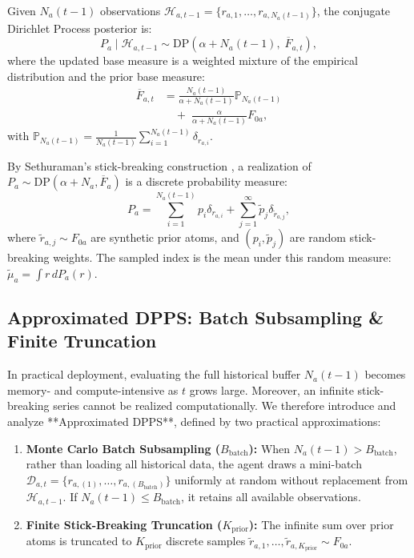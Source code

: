 \documentclass[twoside]{article}
\begin{document}
Given $N_a(t-1)$ observations $\mathcal{H}_{a, t-1} = \{r_{a, 1}, \dots, r_{a, N_a(t-1)}\}$, the conjugate Dirichlet Process posterior is:
\begin{equation}
P_a \mid \mathcal{H}_{a, t-1} \sim \text{DP}\left(\alpha + N_a(t-1), \; \overline{F}_{a, t}\right),
\end{equation}
where the updated base measure is a weighted mixture of the empirical distribution and the prior base measure:
\begin{equation}
\begin{aligned}
\overline{F}_{a, t} &= \frac{N_a(t-1)}{\alpha + N_a(t-1)} \mathbb{P}_{N_a(t-1)} \\
&\quad + \; \frac{\alpha}{\alpha + N_a(t-1)} F_{0a},
\end{aligned}
\end{equation}
with $\mathbb{P}_{N_a(t-1)} = \frac{1}{N_a(t-1)} \sum_{i=1}^{N_a(t-1)} \delta_{r_{a, i}}$.

By Sethuraman's stick-breaking construction \citep{sethuraman1994constructive}, a realization of $P_a \sim \text{DP}(\alpha + N_a, \overline{F}_a)$ is a discrete probability measure:
\begin{equation}
P_a = \sum_{i=1}^{N_a(t-1)} p_i \delta_{r_{a, i}} + \sum_{j=1}^\infty \tilde{p}_j \delta_{\tilde{r}_{a, j}},
\end{equation}
where $\tilde{r}_{a, j} \sim F_{0a}$ are synthetic prior atoms, and $(p_i, \tilde{p}_j)$ are random stick-breaking weights. The sampled index is the mean under this random measure: $\tilde{\mu}_a = \int r \, dP_a(r)$.

\subsection{Approximated DPPS: Batch Subsampling \& Finite Truncation}

In practical deployment, evaluating the full historical buffer $N_a(t-1)$ becomes memory- and compute-intensive as $t$ grows large. Moreover, an infinite stick-breaking series cannot be realized computationally. We therefore introduce and analyze **Approximated DPPS**, defined by two practical approximations:

\begin{enumerate}
    \item \textbf{Monte Carlo Batch Subsampling ($B_{\text{batch}}$):} When $N_a(t-1) > B_{\text{batch}}$, rather than loading all historical data, the agent draws a mini-batch $\mathcal{D}_{a, t} = \{r_{a, (1)}, \dots, r_{a, (B_{\text{batch}})}\}$ uniformly at random without replacement from $\mathcal{H}_{a, t-1}$. If $N_a(t-1) \le B_{\text{batch}}$, it retains all available observations.
    \item \textbf{Finite Stick-Breaking Truncation ($K_{\text{prior}}$):} The infinite sum over prior atoms is truncated to $K_{\text{prior}}$ discrete samples $\tilde{r}_{a, 1}, \dots, \tilde{r}_{a, K_{\text{prior}}} \sim F_{0a}$.
\end{enumerate}
\end{document}
